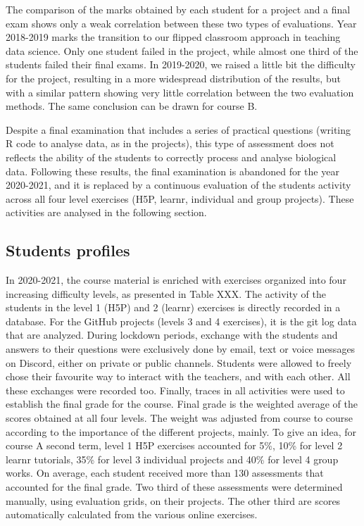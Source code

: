 \documentclass[
]{article}
\begin{document}
The comparison of the marks obtained by each student for a project and a
final exam shows only a weak correlation between these two types of
evaluations. Year 2018-2019 marks the transition to our flipped
classroom approach in teaching data science. Only one student failed in
the project, while almost one third of the students failed their final
exams. In 2019-2020, we raised a little bit the difficulty for the
project, resulting in a more widespread distribution of the results, but
with a similar pattern showing very little correlation between the two
evaluation methods. The same conclusion can be drawn for course B.

Despite a final examination that includes a series of practical
questions (writing R code to analyse data, as in the projects), this
type of assessment does not reflects the ability of the students to
correctly process and analyse biological data. Following these results,
the final examination is abandoned for the year 2020-2021, and it is
replaced by a continuous evaluation of the students activity across all
four level exercises (H5P, learnr, individual and group projects). These
activities are analysed in the following section.

\hypertarget{students-profiles}{%
\subsection{Students profiles}\label{students-profiles}}

In 2020-2021, the course material is enriched with exercises organized
into four increasing difficulty levels, as presented in Table XXX. The
activity of the students in the level 1 (H5P) and 2 (learnr) exercises
is directly recorded in a database. For the GitHub projects (levels 3
and 4 exercises), it is the git log data that are analyzed. During
lockdown periods, exchange with the students and answers to their
questions were exclusively done by email, text or voice messages on
Discord, either on private or public channels. Students were allowed to
freely chose their favourite way to interact with the teachers, and with
each other. All these exchanges were recorded too. Finally, traces in
all activities were used to establish the final grade for the course.
Final grade is the weighted average of the scores obtained at all four
levels. The weight was adjusted from course to course according to the
importance of the different projects, mainly. To give an idea, for
course A second term, level 1 H5P exercises accounted for 5\%, 10\% for
level 2 learnr tutorials, 35\% for level 3 individual projects and 40\%
for level 4 group works. On average, each student received more than 130
assessments that accounted for the final grade. Two third of these
assessments were determined manually, using evaluation grids, on their
projects. The other third are scores automatically calculated from the
various online exercises.
\end{document}
